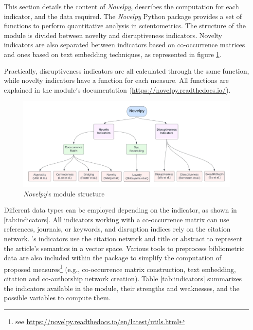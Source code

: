 This section details the content of \textit{Novelpy}, describes the computation for each indicator, and the data required. The \textit{Novelpy} Python package provides a set of functions to perform quantitative analysis in scientometrics. The structure of the module is divided between novelty and disruptiveness indicators. Novelty indicators are also separated between indicators based on co-occurrence matrices and ones based on text embedding techniques, as represented in figure \ref{fig:mindmap}.

Practically, disruptiveness indicators are all calculated through the same function, while novelty indicators have a function for each measure. All functions are explained in the module's documentation (\url{https://novelpy.readthedocs.io/}).
    
    
    \begin{figure}[!h]
    \centering
        \includegraphics[scale= 0.585]{3_chapter3/figures/legende (2).jpeg}
          \caption[\textit{Novelpy}'s module structure]{\textit{Novelpy}'s module structure }
      \label{fig:mindmap}
    \end{figure}
    
Different data types can be employed depending on the indicator, as shown in \ref{tab:indicators}. All indicators working with a co-occurrence matrix can use references, journals, or keywords, and disruption indices rely on the citation network. \cite{shibayama2021measuring}'s indicators use the citation network and title or abstract to represent the article's semantics in a vector space. Various tools to preprocess bibliometric data are also included within the package to simplify the computation of proposed measures\footnote{\justifying see \url{https://novelpy.readthedocs.io/en/latest/utils.html}} (e.g., co-occurrence matrix construction, text embedding, citation and co-authorship network creation). Table \ref{tab:indicators} summarizes the indicators available in the module, their strengths and weaknesses, and the possible variables to compute them.
    
